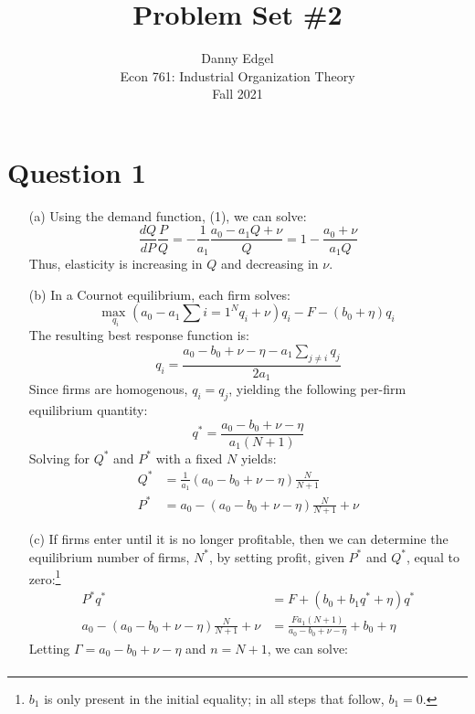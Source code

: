 \documentclass{article}
\newcommand{\usmax}[1]{\underset{#1}{\text{max }}}
\begin{document}
\title{	Problem Set \#2 }
\author{ 	Danny Edgel 					        	      \\ 
			Econ 761: Industrial Organization Theory	\\
			Fall 2021						                      \\
		}
\maketitle\thispagestyle{empty}



\section*{Question 1}
\begin{itemize}
    \item[(a)] Using the demand function, (1), we can solve: \[
    \frac{dQ}{dP}\frac{P}{Q} = -\frac{1}{a_1}\frac{a_0 - a_1Q + \nu}{Q} = 1 - \frac{a_0 + \nu}{a_1Q}
    \] 
    Thus, elasticity is increasing in $Q$ and decreasing in $\nu$.
    \item[(b)] In a Cournot equilibrium, each firm solves:\[
      \usmax{q_i}\left(a_0 - a_1\sum{i=1}^Nq_i + \nu\right)q_i - F - (b_0+\eta)q_i
    \]
    The resulting best response function is:\[
      q_i = \frac{a_0-b_0+\nu-\eta-a_1\sum_{j\neq i}q_j}{2a_1}
    \]
    Since firms are homogenous, $q_i=q_j$, yielding the following per-firm equilibrium quantity:\[
      q^* = \frac{a_0-b_0+\nu-\eta}{a_1(N+1)}
    \]
    Solving for $Q^*$ and $P^*$ with a fixed $N$ yields:\begin{align*}
      Q^* &= \frac{1}{a_1}\left(a_0-b_0+\nu-\eta\right)\frac{N}{N+1} \\ 
      P^* &= a_0 - \left(a_0-b_0+\nu-\eta\right)\frac{N}{N+1} + \nu
    \end{align*}
    \item[(c)] If firms enter until it is no longer profitable, then we can determine the equilibrium number of firms, $N^*$, by setting profit, given $P^*$ and $Q^*$, equal to zero:\footnote{$b_1$ is only present in the initial equality; in all steps that follow, ${b_1=0}$.} \begin{align*} 
      P^*q^*&= F  + (b_0 + b_1q^* + \eta)q^* \\
      a_0-(a_0-b_0+\nu-\eta)\frac{N}{N+1} + \nu &= \frac{Fa_1(N+1)}{a_0-b_0 + \nu - \eta}+b_0+\eta
    \end{align*}
    Letting ${\Gamma=a_0-b_0 + \nu - \eta}$ and ${n=N+1}$, we can solve:\begin{align*}

\end{align*}
\end{itemize}
\end{document}
